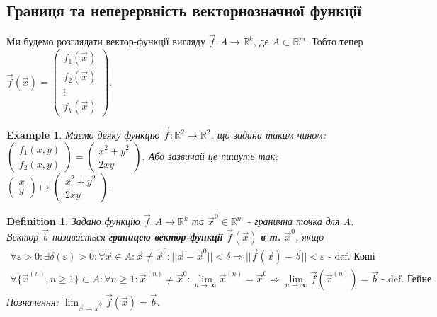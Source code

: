\documentclass[a4paper, 10pt]{article}
\def\huge{\displaystyle}
\theoremstyle{theoremdd}
\theoremstyle{theoremdd}
\newtheorem{definition}[theorem]{Definition}
\theoremstyle{theoremdd}
\theoremstyle{theoremdd}
\newtheorem{example}[theorem]{Example}
\theoremstyle{theoremdd}
\theoremstyle{theoremdd}
\theoremstyle{theoremdd}
\theoremstyle{theoremdd}
\begin{document}
\subsection{Границя та неперервність векторнозначної функції}
\iffalse
Ми будемо розглядати вектор-функції вигляду $\vec{f}: A \to \mathbb{R}^k$, де $A \subset \mathbb{R}^m$. Тобто тепер $\vec{f}(\vec{x}) = \begin{pmatrix}
f_1(\vec{x}) \\ f_2(\vec{x}) \\ \vdots \\ f_k(\vec{x})
\end{pmatrix}$.

\begin{example}
Маємо деяку функцію $\vec{f}: \mathbb{R}^2 \to \mathbb{R}^2$, що задана таким чином:\\
$\begin{pmatrix}
f_1(x,y) \\
f_2(x,y)
\end{pmatrix} = \begin{pmatrix}
x^2 + y^2 \\ 2xy
\end{pmatrix}$. Або зазвичай це пишуть так: $\begin{pmatrix}
x \\ y
\end{pmatrix} \mapsto \begin{pmatrix}
x^2+y^2 \\ 2xy
\end{pmatrix}$.
\end{example}

\begin{definition}
Задано функцію $\vec{f}: A \to \mathbb{R}^k$ та $\vec{x}^0 \in \mathbb{R}^m$ - гранична точка для $A$.\\
Вектор $\vec{b}$ називається \textbf{границею вектор-функції} $\vec{f}(\vec{x})$ \textbf{в т.} $\vec{x}^0$, якщо
\begin{align*}
\forall \varepsilon > 0: \exists \delta(\varepsilon) > 0: \forall \vec{x} \in A: \vec{x} \neq \vec{x}^0: ||\vec{x} - \vec{x}^0 || < \delta \Rightarrow ||\vec{f}(\vec{x}) - \vec{b}|| < \varepsilon \textrm{ - def. Коші}\\
\forall \{\vec{x}^{(n)}, n \geq 1\} \subset A: \forall n \geq 1: \vec{x}^{(n)} \neq \vec{x}^0: \huge \lim_{n \to \infty} \vec{x}^{(n)} = \vec{x}^0 \Rightarrow \lim_{n \to \infty} \vec{f}(\vec{x}^{(n)}) = \vec{b} \textrm{ - def. Гейне}
\end{align*}
Позначення: $\huge \lim_{\vec{x} \to \vec{x}^0} \vec{f}(\vec{x}) = \vec{b}$.
\end{definition}
\end{document}
